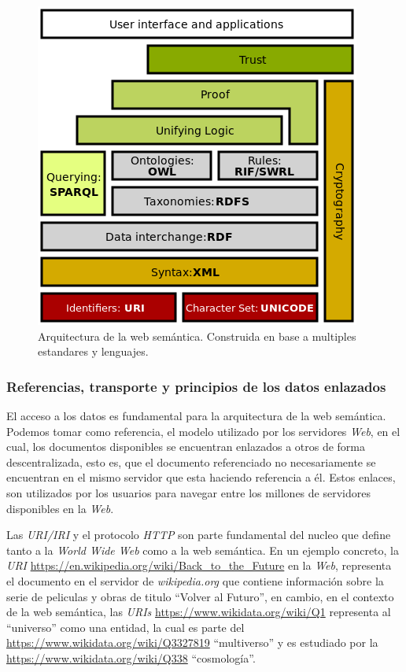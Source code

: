 \documentclass[conference,compsoc]{IEEEtran}
\begin{document}
\begin{figure}
    \centering
    \includegraphics[width=0.8\linewidth]{semantic_web_stack}
    \caption{Arquitectura de la web semántica. Construida en base a multiples estandares y lenguajes.}
    \label{fig:semantic-web-arq}
\end{figure}

    \subsubsection{Referencias, transporte y principios de los datos enlazados}

El acceso a los datos es fundamental para la arquitectura de la web semántica. Podemos tomar como referencia,
el modelo utilizado por los servidores \textit{Web}, en el cual, los documentos disponibles se encuentran
enlazados a otros de forma descentralizada, esto es, que el documento referenciado no necesariamente se
encuentran en el mismo servidor que esta haciendo referencia a él. Estos enlaces, son utilizados por los usuarios
para navegar entre los millones de servidores disponibles en la \textit{Web}.

Las \textit{URI/IRI} y el protocolo \textit{HTTP} son parte fundamental del nucleo que define tanto a la
\textit{World Wide Web} como a la web semántica. En un ejemplo concreto, la \textit{URI}
\url{https://en.wikipedia.org/wiki/Back_to_the_Future} en la \textit{Web}, representa el documento en el
servidor de \textit{wikipedia.org} que contiene información sobre la serie de peliculas y obras de titulo
``Volver al Futuro'', en cambio, en el contexto de la web semántica, las \textit{URIs} \url{https://www.wikidata.org/wiki/Q1} representa al
``universo'' como una entidad, la cual es parte del \url{https://www.wikidata.org/wiki/Q3327819} ``multiverso''
y es estudiado por la \url{https://www.wikidata.org/wiki/Q338} ``cosmología''.
\end{document}
